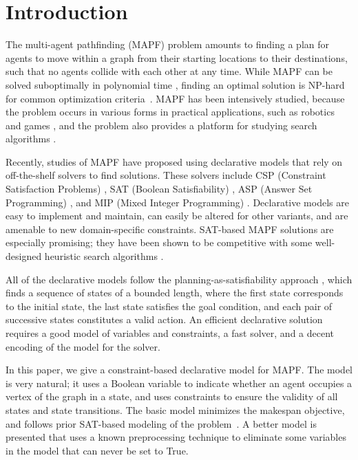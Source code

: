 \documentclass[conference]{IEEEtran}
\begin{document}
\section{Introduction}
The multi-agent pathfinding (MAPF) problem amounts to finding a plan for agents to move within a graph from their starting locations to their destinations, such that no agents collide with each other at any time. While MAPF can be solved suboptimally in polynomial time \cite{RogerH12}, 
finding an optimal solution is NP-hard for common optimization criteria~\cite{Surynek10,YuL13}. %
MAPF has been intensively studied, because the problem occurs in various forms in practical applications, such as robotics and games \cite{DresnerS08,Silver05}, and the problem also provides a platform for studying search algorithms \cite{SharonSGF13,StandleyK11,WangB08}.
  
Recently, studies of MAPF have proposed using declarative models that rely on off-the-shelf solvers to find solutions. These solvers include CSP (Constraint Satisfaction Problems) \cite{Ryan10}, SAT (Boolean Satisfiability) \cite{Surynek14,SurynekFSB16}, ASP (Answer Set Programming) \cite{ErdemKOS13}, and MIP (Mixed Integer Programming) \cite{YuL15d}. Declarative models are easy to implement and maintain, can easily be altered for other variants, and are amenable to new domain-specific constraints. SAT-based MAPF solutions are especially promising; they have been shown to be competitive with some well-designed heuristic search algorithms \cite{SurynekFSB16}.

All of the declarative models follow the planning-as-satisfiability approach \cite{KautzS92}, which finds a sequence of states of a bounded length, where the first state corresponds to the initial state, the last state satisfies the goal condition, and each pair of successive states constitutes a valid action. An efficient declarative solution requires a good model of variables and constraints, a fast solver, and a decent encoding of the model for the solver.


In this paper, we give a constraint-based declarative model for MAPF. 
The model is very natural; it uses a Boolean variable to indicate whether an agent occupies a vertex of the graph in a state, and uses constraints to ensure the validity of all states and state transitions. The basic model minimizes the makespan objective, and follows prior SAT-based modeling of the problem~\cite{surynek2012propositional,surynek2012sat}. A better model is presented that uses a known preprocessing technique to eliminate some variables in the model that can never be set to True. 
\end{document}
